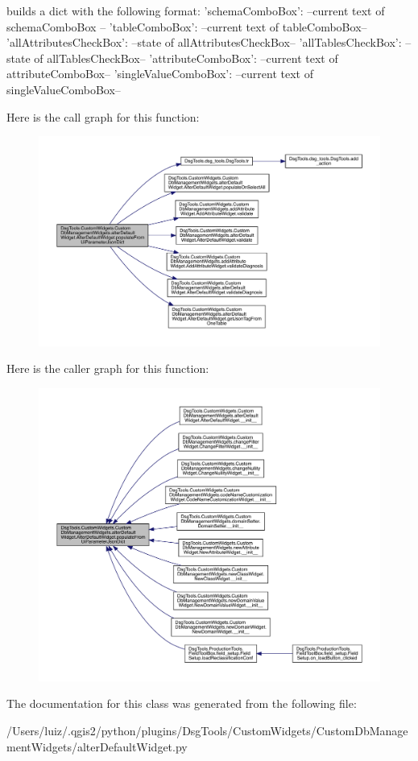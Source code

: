 \begin{DoxyVerb}builds a dict with the following format:
{
    'schemaComboBox': --current text of schemaComboBox --
    'tableComboBox': --current text of tableComboBox--
    'allAttributesCheckBox': --state of allAttributesCheckBox--
    'allTablesCheckBox': --state of allTablesCheckBox--
    'attributeComboBox': --current text of attributeComboBox--
    'singleValueComboBox': --current text of singleValueComboBox--
}
\end{DoxyVerb}
 Here is the call graph for this function\+:
\nopagebreak
\begin{figure}[H]
\begin{center}
\leavevmode
\includegraphics[width=350pt]{class_dsg_tools_1_1_custom_widgets_1_1_custom_db_management_widgets_1_1alter_default_widget_1_1_alter_default_widget_a8d32598b6af4e7befbc034fe38950a28_cgraph}
\end{center}
\end{figure}
Here is the caller graph for this function\+:
\nopagebreak
\begin{figure}[H]
\begin{center}
\leavevmode
\includegraphics[width=350pt]{class_dsg_tools_1_1_custom_widgets_1_1_custom_db_management_widgets_1_1alter_default_widget_1_1_alter_default_widget_a8d32598b6af4e7befbc034fe38950a28_icgraph}
\end{center}
\end{figure}


The documentation for this class was generated from the following file\+:\begin{DoxyCompactItemize}
\item 
/\+Users/luiz/.\+qgis2/python/plugins/\+Dsg\+Tools/\+Custom\+Widgets/\+Custom\+Db\+Management\+Widgets/alter\+Default\+Widget.\+py\end{DoxyCompactItemize}
